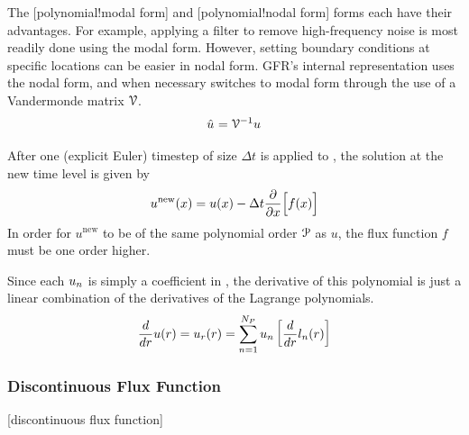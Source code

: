 
The [polynomial!modal form]
and [polynomial!nodal form] forms each have their advantages.
For example, applying a filter to remove high-frequency noise
is most readily done using the modal form.
However, setting boundary conditions at specific locations can
be easier in nodal form.
GFR's internal representation uses the nodal form, and when
necessary switches to modal form through the use of a
Vandermonde matrix ${\cal V}$.
%
\begin{gather}
  \uModal[] = \vand{}^{-1} \uNodal[]
\end{gather}


After one (explicit Euler) timestep of size $\Delta t$ is applied to
, the solution at the new time level is given by
\begin{gather}
  u^{\text{new}} (x)
= u              (x)
- \Delta t \frac{\partial}{\partial x} \Bigl[ f(x) \Bigr]
\end{gather}
In order for $u^\text{new}$ to be of the same polynomial order $\PO$ as $u$, 
the flux function $f$ must be one order higher.


Since each $\uNodal[n]$ is simply a coefficient in ,
the derivative of this polynomial is just a linear combination of the
derivatives of the Lagrange polynomials.
%
\begin{gather}
  \label{EQN:Spatial_Derivative}
  \frac{d}{dr} u(r) = u_r(r)
                    = \sum_{n=1}^{N_P} \uNodal[n] \left[ \frac{d}{dr} l_n(r)
                                                  \right]
\end{gather}


\subsubsection{Discontinuous Flux Function}%
\label{SEC:Intro:FR:DiscontinuousFlux}%
[discontinuous flux function]


